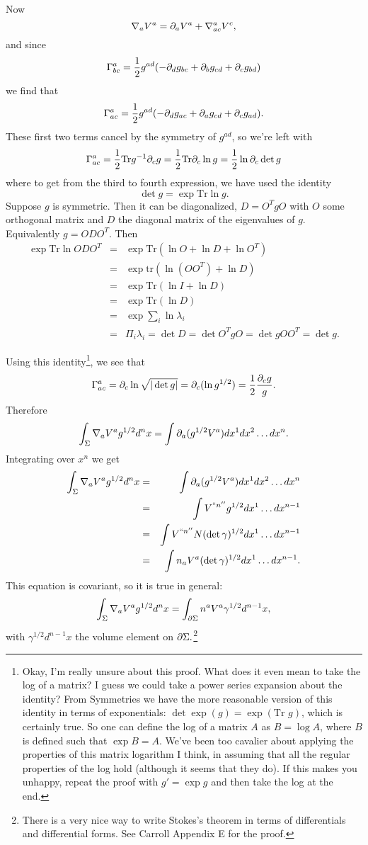 Now
$$\nabla_a V^a=\partial_a V^a +\nabla^a_{ac} V^c,$$
and since
$$\Gamma^a_{bc}=\frac{1}{2}g^{ad}(-\partial_d g_{bc}+\partial_b g_{cd}+\partial_c g_{bd})$$
we find that
$$\Gamma^a_{ac}=\frac{1}{2}g^{ad}(-\partial_d g_{ac}+\partial_a g_{cd}+\partial_c g_{ad}).$$
These first two terms cancel by the symmetry of $g^{ad}$, so we're left with
$$\Gamma^a_{ac}=\frac{1}{2} \text{Tr} g^{-1}\partial_c g=\frac{1}{2}\text{Tr}\partial_c \ln g = \frac{1}{2} \ln \partial_c \det g$$
where to get from the third to fourth expression, we have used the identity
$$\det g = \exp \text{Tr} \ln g.$$
Suppose $g$ is symmetric. Then it can be diagonalized, $D=O^T g O$ with $O$ some orthogonal matrix and $D$ the diagonal matrix of the eigenvalues of $g$. Equivalently $g=O DO^T.$ Then
\begin{eqnarray*}
\exp \text{Tr}\ln ODO^T&=&\exp \text{Tr}(\ln O + \ln D + \ln O^T)\\
&=&\exp \text{tr}(\ln (O O ^T)+\ln D)\\
&=&\exp \text{Tr}(\ln I + \ln D)\\
&=& \exp \text{Tr}(\ln D)\\
&=&\exp \sum_i \ln \lambda_i\\
&=&\Pi_i \lambda_i = \det D = \det O^T g O = \det g O O^T = \det g.
\end{eqnarray*}

Using this identity\footnote{Okay, I'm really unsure about this proof. What does it even mean to take the log of a matrix? I guess we could take a power series expansion about the identity? From Symmetries we have the more reasonable version of this identity in terms of exponentials: $\det \exp(g)= \exp (\text{Tr } g)$, which is certainly true. So one can define the log of a matrix $A$ as $B=\log A$, where $B$ is defined such that $\exp B = A$. We've been too cavalier about applying the properties of this matrix logarithm I think, in assuming that all the regular properties of the log hold (although it seems that they do). If this makes you unhappy, repeat the proof with $g'=\exp g$ and then take the log at the end.}, 
we see that
$$\Gamma^a_{ac}=\partial_c \ln \sqrt{|\det g|}=\partial_c(\ln g^{1/2})=\frac{1}{2} \frac{\partial_c g}{g}.$$ Therefore
$$\int_\Sigma \nabla_a V^a g^{1/2} d^n x=\int \partial_a(g^{1/2} V^a) dx^1 dx^2 \ldots dx^n.$$
Integrating over $x^n$ we get
\begin{eqnarray*}
\int_\Sigma \nabla_a V^a g^{1/2} d^n x&=&\int \partial_a(g^{1/2} V^a) dx^1 dx^2 \ldots dx^n\\
&=& \int V^{``n''} g^{1/2} dx^1 \ldots dx^{n-1}\\
&=& \int V^{``n''}N(\det \gamma)^{1/2} dx^1 \ldots dx^{n-1}\\
&=& \int n_a V^a (\det \gamma)^{1/2} dx^1 \ldots dx^{n-1}.
\end{eqnarray*}
This equation is covariant, so it is true in general:
$$\int_\Sigma \nabla_a V^a g^{1/2} d^n x = \int_{\partial \Sigma} n^a V^a \gamma^{1/2} d^{n-1}x,$$ with $\gamma^{1/2}d^{n-1}x$ the volume element on $\partial \Sigma.$\footnote{There is a very nice way to write Stokes's theorem in terms of differentials and differential forms. See Carroll Appendix E for the proof.}